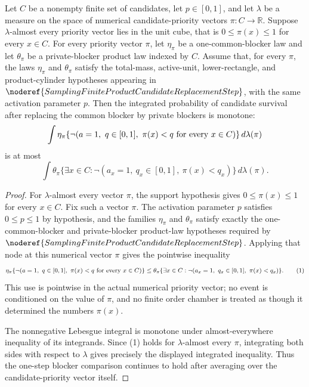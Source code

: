 \begin{helper}
Let \(C\) be a nonempty finite set of candidates, let \(p\in[0,1]\), and let
\(\lambda\) be a measure on the space of numerical candidate-priority vectors
\(\pi:C\to\mathbb R\).  Suppose \(\lambda\)-almost every priority vector lies
in the unit cube, that is \(0\le \pi(x)\le 1\) for every \(x\in C\).
For every priority vector \(\pi\), let \(\eta_\pi\) be a one-common-blocker
law and let \(\theta_\pi\) be a private-blocker product law indexed by \(C\).
Assume that, for every \(\pi\), the laws \(\eta_\pi\) and \(\theta_\pi\)
satisfy the total-mass, active-unit, lower-rectangle, and product-cylinder
hypotheses appearing in
\(\noderef{SamplingFiniteProductCandidateReplacementStep}\), with the same
activation parameter \(p\).  Then the integrated probability of candidate
survival after replacing the common blocker by private blockers is monotone:
\[
\int
\eta_\pi\{\neg(a=1,\ q\in[0,1],\ \pi(x)<q\hbox{ for every }x\in C)\}
\,d\lambda(\pi)
\]
is at most
\[
\int
\theta_\pi\{\exists x\in C:
\neg(a_x=1,\ q_x\in[0,1],\ \pi(x)<q_x)\}
\,d\lambda(\pi).
\]
\end{helper}
\begin{proof}
For \(\lambda\)-almost every vector \(\pi\), the support hypothesis gives
\(0\le \pi(x)\le1\) for every \(x\in C\).  Fix such a vector \(\pi\).  The
activation parameter \(p\) satisfies \(0\le p\le1\) by hypothesis, and the
families \(\eta_\pi\) and \(\theta_\pi\) satisfy exactly the one-common-blocker
and private-blocker product-law hypotheses required by
\(\noderef{SamplingFiniteProductCandidateReplacementStep}\).  Applying that
node at this numerical vector \(\pi\) gives the pointwise inequality
\[
\eta_\pi\{\neg(a=1,\ q\in[0,1],\ \pi(x)<q\hbox{ for every }x\in C)\}
\le
\theta_\pi\{\exists x\in C:
\neg(a_x=1,\ q_x\in[0,1],\ \pi(x)<q_x)\}.
\tag{1}
\]
This use is pointwise in the actual numerical priority vector; no event is
conditioned on the value of \(\pi\), and no finite order chamber is treated as
though it determined the numbers \(\pi(x)\).

The nonnegative Lebesgue integral is monotone under almost-everywhere
inequality of its integrands.  Since (1) holds for \(\lambda\)-almost every
\(\pi\), integrating both sides with respect to \(\lambda\) gives precisely
the displayed integrated inequality.  Thus the one-step blocker comparison
continues to hold after averaging over the candidate-priority vector itself.
\end{proof}

